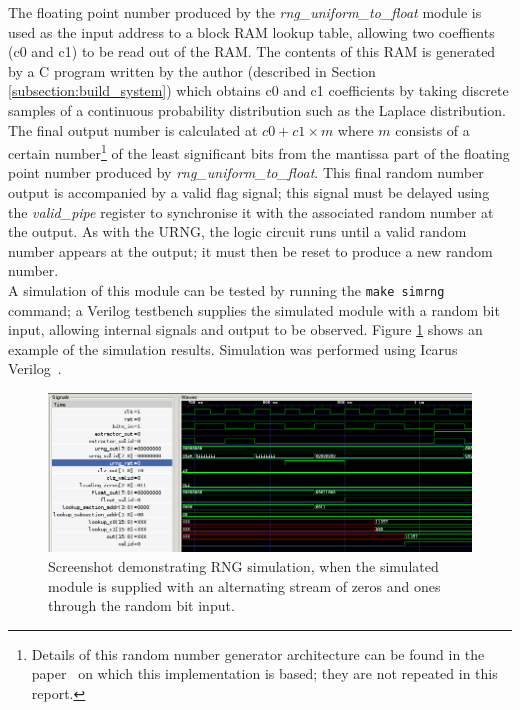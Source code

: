 \documentclass[12pt]{article}
\begin{document}
        The floating point number produced by the \textit{rng\_uniform\_to\_float} module is used as the input address to a block RAM lookup table, allowing two coeffients (c0 and c1) to be read out of the RAM. The contents of this RAM is generated by a C program written by the author (described in Section \ref{subsection:build_system}) which obtains c0 and c1 coefficients by taking discrete samples of a continuous probability distribution such as the Laplace distribution. The final output number is calculated at $c0 + c1 \times m$ where $m$ consists of a certain number\footnote{Details of this random number generator architecture can be found in the paper~\cite{DeSchryver} on which this implementation is based; they are not repeated in this report.} of the least significant bits from the mantissa part of the floating point number produced by \textit{rng\_uniform\_to\_float}. This final random number output is accompanied by a valid flag signal; this signal must be delayed using the \textit{valid\_pipe} register to synchronise it with the associated random number at the output. As with the URNG, the logic circuit runs until a valid random number appears at the output; it must then be reset to produce a new random number.\\

        A simulation of this module can be tested by running the \texttt{make simrng} command; a Verilog testbench supplies the simulated module with a random bit input, allowing internal signals and output to be observed. Figure \ref{fig:rng_test} shows an example of the simulation results. Simulation was performed using Icarus Verilog~\cite{icarus}.

        \begin{figure}[H]
          \centering
          \includegraphics[width=\textwidth]{fig/rng_test.png}
          \caption{Screenshot demonstrating RNG simulation, when the simulated module is supplied with an alternating stream of zeros and ones through the random bit input.}
          \label{fig:rng_test}
        \end{figure}
\end{document}
